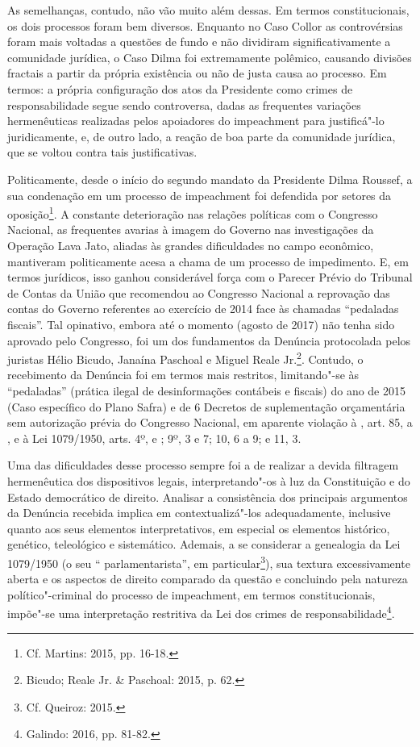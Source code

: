 As semelhanças, contudo, não vão muito além dessas. Em termos
constitucionais, os dois processos foram bem diversos. Enquanto no Caso
Collor as controvérsias foram mais voltadas a questões de fundo e não
dividiram significativamente a comunidade jurídica, o Caso Dilma foi
extremamente polêmico, causando divisões fractais a partir da própria
existência ou não de justa causa ao processo. Em termos: a própria
configuração dos atos da Presidente como crimes de responsabilidade
segue sendo controversa, dadas as frequentes variações hermenêuticas
realizadas pelos apoiadores do impeachment para justificá"-lo
juridicamente, e, de outro lado, a reação de boa parte da comunidade
jurídica, que se voltou contra tais justificativas.

Politicamente, desde o início do segundo mandato da Presidente Dilma
Roussef, a sua condenação em um processo de impeachment foi
defendida por setores da oposição\footnote{Cf. Martins: 2015, pp. 16-18.}. A
constante deterioração nas relações políticas com o Congresso Nacional,
as frequentes avarias à imagem do Governo nas investigações da Operação
Lava Jato, aliadas às grandes dificuldades no campo econômico,
mantiveram politicamente acesa a chama de um processo de impedimento. E,
em termos jurídicos, isso ganhou considerável força com o Parecer Prévio
do Tribunal de Contas da União que recomendou ao Congresso Nacional a
reprovação das contas do Governo referentes ao exercício de 2014 face às
chamadas ``pedaladas fiscais''. Tal opinativo, embora até o momento
(agosto de 2017) não tenha sido aprovado pelo Congresso, foi um dos
fundamentos da Denúncia protocolada pelos juristas Hélio Bicudo, Janaína
Paschoal e Miguel Reale Jr.\footnote{Bicudo; Reale Jr. \& Paschoal: 2015, p.
62.}. Contudo, o recebimento da Denúncia foi em termos mais restritos,
limitando"-se às ``pedaladas'' (prática ilegal de desinformações
contábeis e fiscais) do ano de 2015 (Caso específico do Plano Safra) e
de 6 Decretos de suplementação orçamentária sem autorização prévia do
Congresso Nacional, em aparente violação à , art. 85,  a , e à Lei
1079/1950, arts. 4º,  e ; 9º, 3 e 7; 10, 6 a 9; e 11, 3.

Uma das dificuldades desse processo sempre foi a de realizar a devida
filtragem hermenêutica dos dispositivos legais, interpretando"-os à luz
da Constituição e do Estado democrático de direito. Analisar a
consistência dos principais argumentos da Denúncia recebida implica em
contextualizá"-los adequadamente, inclusive quanto aos seus elementos
interpretativos, em especial os elementos histórico, genético,
teleológico e sistemático. Ademais, a se considerar a genealogia da Lei
1079/1950 (o seu `` parlamentarista'', em particular\footnote{Cf. Queiroz:
2015.}), sua textura excessivamente aberta e os aspectos de direito
comparado da questão e concluindo pela natureza político"-criminal do
processo de impeachment, em termos constitucionais, impõe"-se uma
interpretação restritiva da Lei dos crimes de responsabilidade\footnote{Galindo:
2016, pp. 81-82.}.

